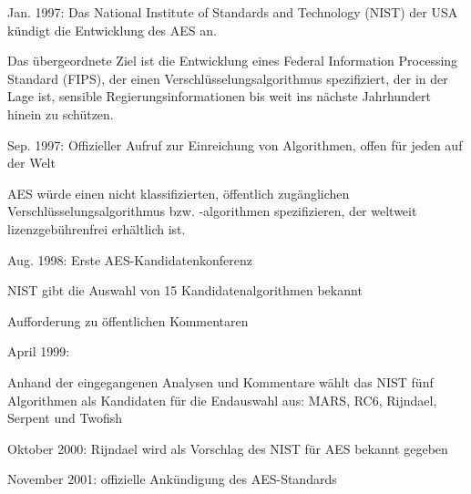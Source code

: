 \documentclass[a4paper]{article}
\begin{document}
\begin{multicols}{3}
      \begin{itemize*}
            \item Jan. 1997: Das National Institute of Standards and Technology (NIST)
            der USA kündigt die Entwicklung des AES an.
            \begin{itemize*}
                  \item Das übergeordnete Ziel ist die Entwicklung eines Federal Information Processing Standard (FIPS), der einen Verschlüsselungsalgorithmus spezifiziert, der in der Lage ist, sensible Regierungsinformationen bis weit ins nächste Jahrhundert hinein zu schützen.
            \end{itemize*}
            \item Sep. 1997: Offizieller Aufruf zur Einreichung von Algorithmen, offen
            für jeden auf der Welt
            \begin{itemize*}
                  \item AES würde einen nicht klassifizierten, öffentlich zugänglichen Verschlüsselungsalgorithmus bzw. -algorithmen spezifizieren, der weltweit lizenzgebührenfrei erhältlich ist.
            \end{itemize*}
            \item Aug. 1998: Erste AES-Kandidatenkonferenz
            \begin{itemize*}
                  \item NIST gibt die Auswahl von 15 Kandidatenalgorithmen bekannt
                  \item Aufforderung zu öffentlichen Kommentaren
            \end{itemize*}
            \item April 1999:
            \begin{itemize*}
                  \item Anhand der eingegangenen Analysen und Kommentare wählt das NIST fünf Algorithmen als Kandidaten für die Endauswahl aus: MARS, RC6, Rijndael, Serpent und Twofish
            \end{itemize*}
            \item Oktober 2000: Rijndael wird als Vorschlag des NIST für AES bekannt
            gegeben
            \begin{itemize*}
                  \item \begin{enumerate*} \def\labelenumi{\arabic{enumi}.} \setcounter{enumi}{25} \item November 2001: offizielle Ankündigung des AES-Standards \end{enumerate*}

\end{itemize*}
\end{itemize*}
\end{multicols}
\end{document}
